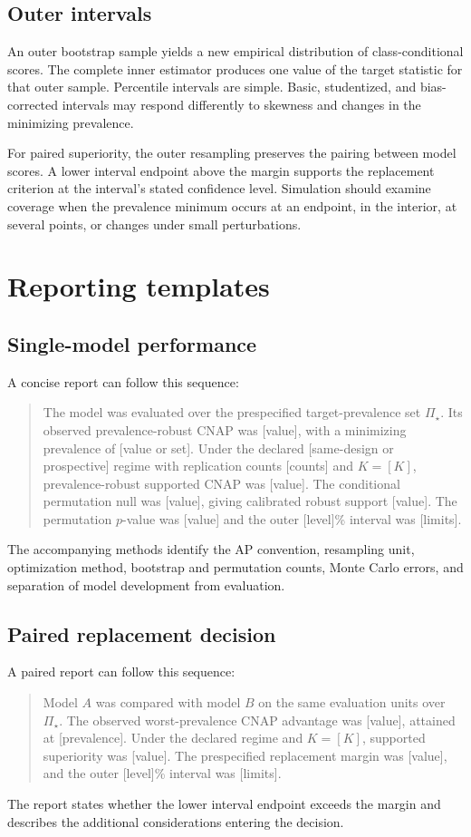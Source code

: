 \documentclass[11pt]{article}
\newcommand{\PSet}{\Pi_\star}
\theoremstyle{remark}
\begin{document}
\subsection{Outer intervals}

An outer bootstrap sample yields a new empirical distribution of class-conditional scores. The complete inner estimator produces one value of the target statistic for that outer sample. Percentile intervals are simple. Basic, studentized, and bias-corrected intervals may respond differently to skewness and changes in the minimizing prevalence.

For paired superiority, the outer resampling preserves the pairing between model scores. A lower interval endpoint above the margin supports the replacement criterion at the interval's stated confidence level. Simulation should examine coverage when the prevalence minimum occurs at an endpoint, in the interior, at several points, or changes under small perturbations.

\section{Reporting templates}
\label{app:report-template}

\subsection{Single-model performance}

A concise report can follow this sequence:
\begin{quote}
The model was evaluated over the prespecified target-prevalence set $\PSet$. Its observed prevalence-robust CNAP was [value], with a minimizing prevalence of [value or set]. Under the declared [same-design or prospective] regime with replication counts [counts] and $K=[K]$, prevalence-robust supported CNAP was [value]. The conditional permutation null was [value], giving calibrated robust support [value]. The permutation $p$-value was [value] and the outer [level]\% interval was [limits].
\end{quote}
The accompanying methods identify the AP convention, resampling unit, optimization method, bootstrap and permutation counts, Monte Carlo errors, and separation of model development from evaluation.

\subsection{Paired replacement decision}

A paired report can follow this sequence:
\begin{quote}
Model $A$ was compared with model $B$ on the same evaluation units over $\PSet$. The observed worst-prevalence CNAP advantage was [value], attained at [prevalence]. Under the declared regime and $K=[K]$, supported superiority was [value]. The prespecified replacement margin was [value], and the outer [level]\% interval was [limits].
\end{quote}
The report states whether the lower interval endpoint exceeds the margin and describes the additional considerations entering the decision.
\end{document}
